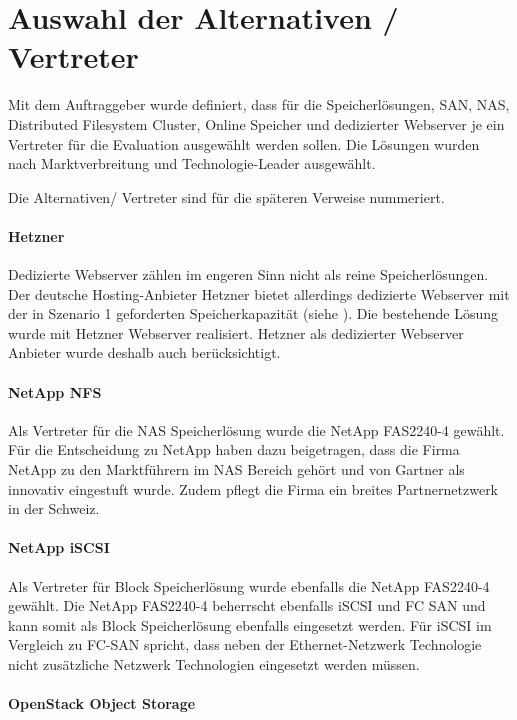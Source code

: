 \section{Auswahl der Alternativen / Vertreter}
Mit dem Auftraggeber wurde definiert, dass für die Speicherlösungen, SAN, NAS, Distributed Filesystem Cluster, Online Speicher und dedizierter Webserver je ein Vertreter für die Evaluation ausgewählt werden sollen. Die Lösungen wurden nach Marktverbreitung und Technologie-Leader ausgewählt.

Die Alternativen/ Vertreter sind für die späteren Verweise nummeriert.

\setcounter{paragraph}{0}
\renewcommand\theparagraph{Al-\arabic{paragraph}}
\paragraph{Hetzner}\label{Al-1}
Dedizierte Webserver zählen im engeren Sinn nicht als reine Speicherlösungen. Der deutsche Hosting-Anbieter Hetzner bietet allerdings dedizierte Webserver mit der in Szenario 1 geforderten Speicherkapazität (siehe ). Die bestehende Lösung wurde mit Hetzner Webserver realisiert. Hetzner als dedizierter Webserver Anbieter wurde deshalb auch berücksichtigt. 

\paragraph{NetApp NFS}\label{Al-2}
Als Vertreter für die NAS Speicherlösung wurde die NetApp FAS2240-4 gewählt. Für die Entscheidung zu NetApp haben dazu beigetragen, dass die Firma NetApp zu den Marktführern im NAS Bereich gehört und von Gartner als innovativ eingestuft wurde. Zudem pflegt die Firma ein breites Partnernetzwerk in der Schweiz.

\paragraph{NetApp iSCSI}\label{Al-3}
Als Vertreter für Block Speicherlösung wurde ebenfalls die NetApp FAS2240-4 gewählt. Die NetApp FAS2240-4 beherrscht ebenfalls iSCSI und FC SAN und kann somit als Block Speicherlösung ebenfalls eingesetzt werden. Für iSCSI im Vergleich zu FC-SAN spricht, dass neben der Ethernet-Netzwerk Technologie nicht zusätzliche Netzwerk Technologien eingesetzt werden müssen.

\paragraph{OpenStack Object Storage}\label{Al-4}

